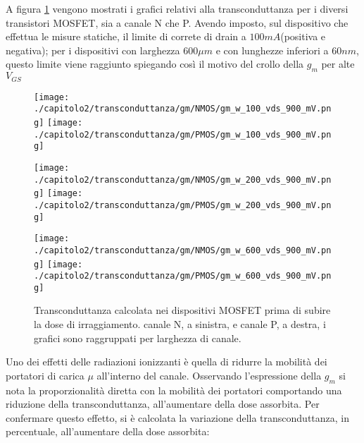 \vspace{0.5cm}

A figura \ref{fig:gm_w} vengono mostrati i grafici relativi alla transconduttanza per i diversi transistori MOSFET, sia a canale N che P. Avendo imposto, sul dispositivo che effettua le misure statiche, il limite di correte di drain a $100mA$(positiva e negativa); per i dispositivi con larghezza $600\mu m$ e con lunghezze inferiori a $60nm$, questo limite viene raggiunto spiegando così il motivo del crollo della $g_m$ per alte $V_{GS}$

\begin{figure}[t]
    \centering
    \texttt{[image: ./capitolo2/transconduttanza/gm/NMOS/gm\_w\_100\_vds\_900\_mV.png]}
    \texttt{[image: ./capitolo2/transconduttanza/gm/PMOS/gm\_w\_100\_vds\_900\_mV.png]}

    \vspace{0.5cm}
    \texttt{[image: ./capitolo2/transconduttanza/gm/NMOS/gm\_w\_200\_vds\_900\_mV.png]}
    \texttt{[image: ./capitolo2/transconduttanza/gm/PMOS/gm\_w\_200\_vds\_900\_mV.png]}
    \vspace{0.5cm}

    \texttt{[image: ./capitolo2/transconduttanza/gm/NMOS/gm\_w\_600\_vds\_900\_mV.png]}
    \texttt{[image: ./capitolo2/transconduttanza/gm/PMOS/gm\_w\_600\_vds\_900\_mV.png]}

    \caption[Dati $g_m$ estratti pre-irraggiamento]{Transconduttanza calcolata nei dispositivi MOSFET prima di subire la dose di irraggiamento. canale N, a sinistra, e canale P, a destra, i grafici sono raggruppati per larghezza di canale.}
    \label{fig:gm_w}

\end{figure}


\vspace{0.5cm}

Uno dei effetti delle radiazioni ionizzanti è quella di ridurre la mobilità dei portatori di carica $\mu$ all'interno del canale. Osservando  l'espressione della $g_m$ si nota la proporzionalità diretta con la mobilità dei portatori comportando una riduzione della transconduttanza, all'aumentare della dose assorbita. Per confermare questo effetto, si è calcolata la variazione della transconduttanza, in percentuale, all'aumentare della dose assorbita:

